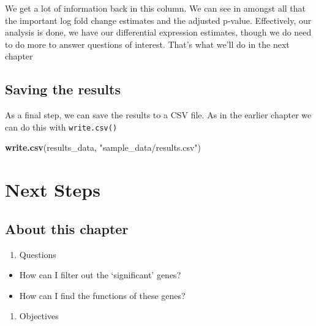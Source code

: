 \documentclass[]{book}
\newenvironment{Shaded}{\begin{snugshade}}{\end{snugshade}}
\newcommand{\KeywordTok}[1]{\textcolor[rgb]{0.13,0.29,0.53}{\textbf{#1}}}
\newcommand{\NormalTok}[1]{#1}
\newcommand{\StringTok}[1]{\textcolor[rgb]{0.31,0.60,0.02}{#1}}
\providecommand{\tightlist}{%
  \setlength{\itemsep}{0pt}\setlength{\parskip}{0pt}}
\begin{document}
We get a lot of information back in this column. We can see in amongst all that the important log fold change estimates and the adjusted p-value. Effectively, our analysis is done, we have our differential expression estimates, though we do need to do more to answer questions of interest. That's what we'll do in the next chapter

\hypertarget{saving-the-results}{%
\section{Saving the results}\label{saving-the-results}}

As a final step, we can save the results to a CSV file. As in the earlier chapter we can do this with \texttt{write.csv()}

\begin{Shaded}
\begin{Highlighting}[]
\KeywordTok{write.csv}\NormalTok{(results_data, }\StringTok{"sample_data/results.csv"}\NormalTok{)}
\end{Highlighting}
\end{Shaded}

\hypertarget{next-steps}{%
\chapter{Next Steps}\label{next-steps}}

\hypertarget{about-this-chapter-2}{%
\section{About this chapter}\label{about-this-chapter-2}}

\begin{enumerate}
\def\labelenumi{\arabic{enumi}.}
\tightlist
\item
  Questions
\end{enumerate}

\begin{itemize}
\tightlist
\item
  How can I filter out the `significant' genes?
\item
  How can I find the functions of these genes?
\end{itemize}

\begin{enumerate}
\def\labelenumi{\arabic{enumi}.}
\setcounter{enumi}{1}
\tightlist
\item
  Objectives
\end{enumerate}
\end{document}
